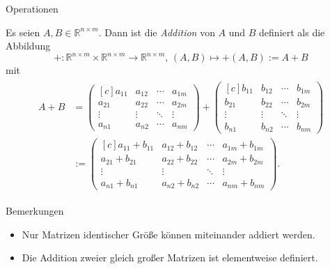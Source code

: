 \documentclass[
  8pt,
  ignorenonframetext,
]{beamer}
\providecommand{\tightlist}{%
  \setlength{\itemsep}{0pt}\setlength{\parskip}{0pt}}
\begin{document}
\begin{frame}{Operationen}
\protect\hypertarget{operationen-1}{}
\footnotesize
\begin{definition}[Matrixaddition]
Es seien $A,B\in \mathbb{R}^{n\times m}$. Dann ist  die \textit{Addition} von $A$
und $B$ definiert als die Abbildung
\begin{equation}
+ : \mathbb{R}^{n\times m} \times \mathbb{R}^{n\times m} \to \mathbb{R}^{n \times m}, \,
(A,B) \mapsto +(A,B) := A + B
\end{equation}
mit
\begin{align}
\begin{split}
A + B
& =
\begin{pmatrix*}[c]
a_{11} & a_{12} & \cdots & a_{1m} \\
a_{21} & a_{22} & \cdots & a_{2m} \\
\vdots & \vdots & \ddots & \vdots \\
a_{n1} & a_{n2} & \cdots & a_{nm}
\end{pmatrix*}
+
\begin{pmatrix*}[c]
b_{11} & b_{12} & \cdots & b_{1m} \\
b_{21} & b_{22} & \cdots & b_{2m} \\
\vdots & \vdots & \ddots & \vdots \\
b_{n1} & b_{n2} & \cdots & b_{nm}
\end{pmatrix*}
\\
&
:=
\begin{pmatrix*}[c]
a_{11} + b_{11} & a_{12} + b_{12} & \cdots & a_{1m} + b_{1m} \\
a_{21} + b_{21} & a_{22} + b_{22} & \cdots & a_{2m} + b_{2m} \\
\vdots & \vdots & \ddots & \vdots \\
a_{n1} + b_{n1} & a_{n2} + b_{n2} & \cdots & a_{nm} + b_{nm}
\end{pmatrix*}.
\end{split}
\end{align}
\end{definition}

Bemerkungen

\begin{itemize}
\tightlist
\item
  Nur Matrizen identischer Größe können miteinander addiert werden.
\item
  Die Addition zweier gleich großer Matrizen ist elementweise definiert.
\end{itemize}
\end{frame}
\end{document}
